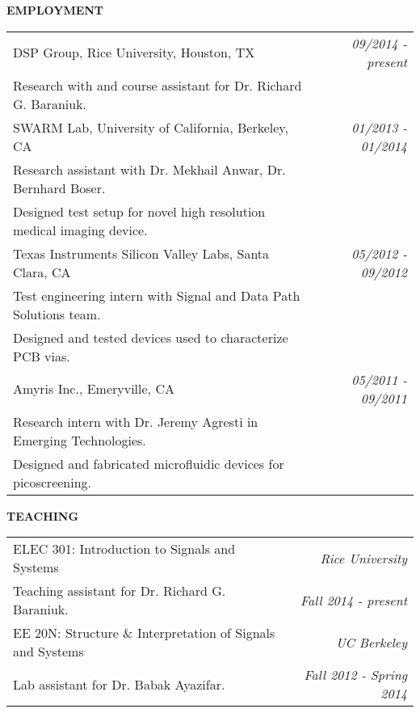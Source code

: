 \documentclass[12pt]{article}
\begin{document}
\vspace{.3in}

\textbf{\textsf{EMPLOYMENT}} \\[.5em]
\begin{tabular*}{\textwidth}{@{\extracolsep{\fill}} l r}
DSP Group, Rice University, Houston, {\small \textsc{TX}} &  \textsl{09/2014 - present} \\
Research with and course assistant for Dr. Richard G. Baraniuk. & \\[.6em]
SWARM Lab, University of California, Berkeley, {\small \textsc{CA}} & \textsl{01/2013 - 01/2014} \\
Research assistant with Dr. Mekhail Anwar, Dr. Bernhard Boser. &  \\
Designed test setup for novel high resolution medical imaging device. & \\[.6em]
Texas Instruments Silicon Valley Labs, Santa Clara, {\small \textsc{CA}} & \textsl{05/2012 - 09/2012} \\
Test engineering intern with Signal and Data Path Solutions team. & \\
Designed and tested devices used to characterize PCB vias. & \\[.6em]
Amyris Inc., Emeryville, {\small \textsc{CA}} & \textsl{05/2011 - 09/2011} \\
Research intern with Dr. Jeremy Agresti in Emerging Technologies. & \\
Designed and fabricated microfluidic devices for picoscreening. &
\end{tabular*}

\vspace{.3in}

\textbf{\textsf{TEACHING}} \\[.5em]
\begin{tabular*}{\textwidth}{@{\extracolsep{\fill}} l r}
ELEC 301: Introduction to Signals and Systems & \textsl{Rice University} \\
Teaching assistant for Dr. Richard G. Baraniuk. & \textsl{Fall 2014 - present} \\[.6em]
EE 20N: Structure \& Interpretation of Signals and Systems & \textsl{UC Berkeley} \\
Lab assistant for Dr. Babak Ayazifar. & \textsl{Fall 2012 - Spring 2014}
\end{tabular*}
\end{document}
